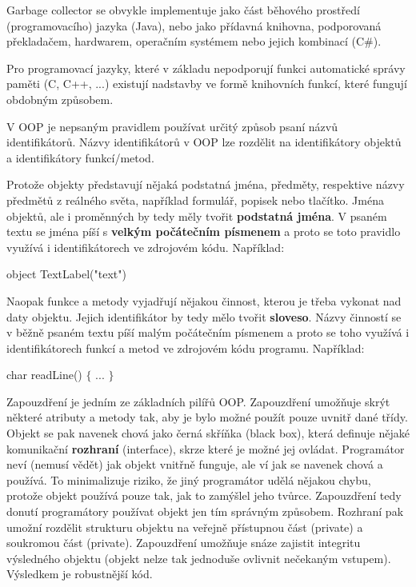 
Garbage collector se obvykle implementuje jako část běhového prostředí (programovacího) jazyka (Java), nebo jako přídavná knihovna, podporovaná překladačem, hardwarem, operačním systémem nebo jejich kombinací (C\#).

Pro programovací jazyky, které v základu nepodporují funkci automatické správy paměti (C, C++, ...) existují nadstavby ve formě knihovních funkcí, které fungují obdobným způsobem. 





V OOP je nepsaným pravidlem používat určitý způsob psaní názvů identifikátorů. Názvy identifikátorů v OOP lze rozdělit na identifikátory objektů a identifikátory funkcí/metod. 

Protože objekty představují nějaká podstatná jména, předměty, respektive názvy předmětů z reálného světa, například formulář, popisek nebo tlačítko. Jména objektů, ale i proměnných by tedy měly tvořit {\bf podstatná jména}. V psaném textu se jména píší s {\bf velkým počátečním písmenem} a proto se toto pravidlo využívá i identifikátorech ve zdrojovém kódu. Například:

\vskip 4mm
{\verbatim
\odradkovat
object TextLabel("text")\odradkovat
}
\vskip 4mm

Naopak funkce a metody vyjadřují nějakou činnost, kterou je třeba vykonat nad daty objektu. Jejich identifikátor by tedy mělo tvořit {\bf sloveso}. Názvy činností se v běžně psaném textu píší malým počátečním písmenem a proto se toho využívá i identifikátorech funkcí a metod ve zdrojovém kódu programu. Například:

\vskip 4mm
{\verbatim
\odradkovat
char readLine()\odradkovat
$\{$\odradkovat
...\odradkovat
$\}$\odradkovat
}
\vskip 4mm


Zapouzdření je jedním ze základních pilířů OOP. Zapouzdření umožňuje skrýt některé atributy a metody tak, aby je bylo možné použít pouze uvnitř dané třídy. Objekt se pak navenek chová jako černá skříňka (black box), která definuje nějaké komunikační {\bf rozhraní} (interface), skrze které je možné jej ovládat. Programátor neví (nemusí vědět) jak objekt vnitřně funguje, ale ví jak se navenek chová a používá. To minimalizuje riziko, že jiný programátor udělá nějakou chybu, protože objekt používá pouze tak, jak to zamýšlel jeho tvůrce. Zapouzdření tedy donutí programátory používat objekt jen tím správným způsobem. Rozhraní pak umožní rozdělit strukturu objektu na veřejně přístupnou část (private) a soukromou část (private). Zapouzdření umožňuje snáze zajistit integritu výsledného objektu (objekt nelze tak jednoduše ovlivnit nečekaným vstupem). Výsledkem je robustnější kód.

